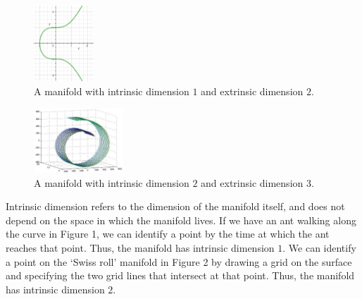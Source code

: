 \documentclass[11pt]{article}
\begin{document}
\begin{figure}[h]
\begin{center}
\includegraphics[width=0.2\textwidth]{ex1.eps}
\end{center}
\vspace{-0.2in}
\caption{A manifold with intrinsic dimension $1$ and extrinsic dimension $2$.}
\label{fig:1}
\end{figure}
\vspace{-0.2in}
\begin{figure}[h]
\begin{center}
\includegraphics[width=0.3\textwidth]{ex2.eps}
\end{center}
\vspace{-0.2in}
\caption{A manifold with intrinsic dimension $2$ and extrinsic dimension $3$.}
\label{fig:2}
\end{figure}

Intrinsic dimension refers to the dimension of the manifold itself, and does
not depend on the space in which the manifold lives. If we have an ant walking
along the curve in Figure 1, we can identify a point by the
time at which the ant reaches that point. Thus, the manifold has intrinsic
dimension $1$. We can identify a point on the `Swiss roll' manifold in Figure 2
by drawing a grid on the surface and specifying the two grid lines that
intersect at that point. Thus, the manifold has intrinsic dimension $2$.
\end{document}
